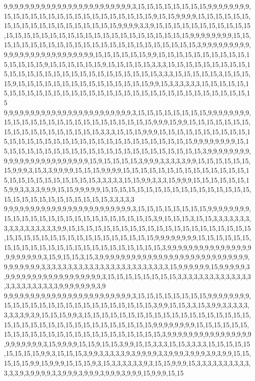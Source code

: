 9,9,9,9,9,9,9,9,9,9,9,9,9,9,9,9,9,9,9,9,9,9,9,9,3,15,15,15,15,15,15,15,15,9,9,9,9,9,9,9,9,15,15,15,15,15,15,15,15,15,15,15,15,15,15,15,15,15,9,15,15,9,9,9,9,15,15,15,15,15,15,15,15,15,15,15,15,15,15,15,15,15,15,15,9,9,9,9,3,3,9,15,15,15,15,15,15,15,15,15,15,15,15,15,15,15,15,15,15,15,15,15,15,15,15,15,15,15,15,15,15,15,15,9,9,9,9,9,9,9,9,15,15,15,15,15,15,15,15,15,15,15,15,15,15,15,15,15,15,15,15,15,15,15,15,3,9,9,9,9,9,9,9,9,9,9,9,9,9,9,9,9,9,9,9,9,9,9,9,9,9,9,15,15,15,15,15,15,9,9,15,15,15,15,15,15,15,15,15,15,15,15,15,15,15,9,15,15,15,15,15,15,9,15,15,15,15,15,3,3,3,15,15,15,15,15,15,15,15,15,15,15,15,15,15,15,15,15,15,15,15,15,15,15,15,15,15,15,3,3,3,15,15,15,15,15,3,15,15,15,15,9,15,15,15,15,15,15,15,15,15,15,15,15,15,15,15,9,9,15,3,3,3,3,3,3,15,15,15,15,15,15,15,15,15,15,15,15,15,15,15,15,15,15,15,15,15,15,15,15,15,15,15,15,15,15,15,15,15,15
9,9,9,9,9,9,9,9,9,9,9,9,9,9,9,9,9,9,9,9,9,9,9,9,3,15,15,15,15,15,15,15,15,9,9,9,9,9,9,9,9,15,15,15,15,15,15,15,15,15,15,15,15,15,15,15,15,15,9,9,9,15,9,9,15,15,15,15,15,15,15,15,15,15,15,15,15,15,15,15,15,15,3,3,3,15,15,15,9,9,9,15,15,15,15,15,15,15,15,15,15,15,15,15,15,15,15,15,15,15,15,15,15,15,15,15,15,15,15,15,15,15,15,9,9,9,9,9,9,9,9,15,15,15,15,15,15,15,15,15,15,15,15,15,15,15,15,15,15,15,15,15,15,15,15,3,9,9,9,9,9,9,9,9,9,9,9,9,9,9,9,9,9,9,9,9,9,9,9,9,15,9,15,15,15,15,3,9,9,9,3,3,3,3,3,9,9,15,15,15,15,15,15,15,9,9,9,3,15,3,3,9,9,9,9,15,15,15,9,9,9,9,15,15,15,15,15,15,15,15,15,15,15,15,15,15,15,15,15,15,15,15,15,15,15,15,15,3,3,3,3,3,15,15,9,9,3,3,3,15,9,9,9,15,15,15,15,15,15,15,9,9,3,3,3,3,9,9,9,15,15,9,9,9,9,9,15,15,15,15,15,15,15,15,15,15,15,15,15,15,15,15,15,15,15,15,15,15,15,15,15,15,15,15,15,3,3,3,3,3
9,9,9,9,9,9,9,9,9,9,9,9,9,9,9,9,9,9,9,9,9,9,9,9,3,15,15,15,15,15,15,15,15,9,9,9,9,9,9,9,9,15,15,15,15,15,15,15,15,15,15,15,15,15,15,15,15,15,3,9,15,15,15,3,15,15,3,3,3,3,3,3,3,3,3,3,3,3,3,3,3,3,3,9,9,15,15,15,15,15,15,15,15,15,15,15,15,15,15,15,15,15,15,15,15,15,15,15,15,15,15,15,15,15,15,15,15,15,15,15,15,15,15,9,9,9,9,9,9,9,9,15,15,15,15,15,15,15,15,15,15,15,15,15,15,15,15,15,15,15,15,15,15,15,15,3,9,9,9,9,9,9,9,9,9,9,9,9,9,9,9,9,9,9,9,9,9,9,9,3,15,9,15,15,3,15,3,9,9,9,9,9,9,9,9,9,9,9,9,9,9,9,9,9,9,9,9,9,9,9,9,9,9,9,9,9,9,9,9,9,9,9,3,3,3,3,3,3,3,3,3,3,3,3,3,3,3,3,3,3,3,3,3,3,3,3,15,9,9,9,9,9,9,15,9,9,9,9,9,3,9,9,9,9,9,9,9,9,9,9,9,9,9,9,9,9,9,9,3,15,15,15,15,15,15,15,15,3,3,3,3,3,3,3,3,3,3,3,3,3,3,3,3,3,3,3,3,3,3,3,3,9,9,9,9,9,9,9,3,9
9,9,9,9,9,9,9,9,9,9,9,9,9,9,9,9,9,9,9,9,9,9,9,9,3,15,15,15,15,15,15,15,15,9,9,9,9,9,9,9,9,15,15,15,15,15,15,15,15,15,15,15,15,15,15,15,15,15,3,9,9,15,15,3,3,15,3,9,9,3,3,3,3,3,3,3,3,3,9,3,9,15,15,15,9,9,3,15,15,15,15,15,15,15,15,15,15,15,15,15,15,15,15,15,15,15,15,15,15,15,15,15,15,15,15,15,15,15,15,15,15,15,15,9,9,9,9,9,9,9,9,15,15,15,15,15,15,15,15,15,15,15,15,15,15,15,15,15,15,15,15,15,15,15,15,3,9,9,9,9,9,9,9,9,9,9,9,9,9,9,9,9,9,9,9,9,9,9,9,3,15,9,9,9,9,15,15,9,15,15,3,9,9,15,15,3,3,3,15,15,3,3,3,3,15,15,15,15,15,15,15,15,15,9,9,3,15,15,15,3,9,9,3,3,3,3,3,9,3,9,9,9,9,3,3,9,9,9,3,9,9,9,3,9,3,9,9,15,15,15,15,15,9,9,15,9,9,9,15,15,15,9,3,15,3,3,3,3,3,3,9,3,15,15,9,9,9,15,3,3,3,3,3,3,3,3,3,3,3,3,3,9,3,9,9,9,9,3,3,9,9,9,3,9,9,9,3,9,9,9,3,9,9,9,15,9,9,9,15,15
